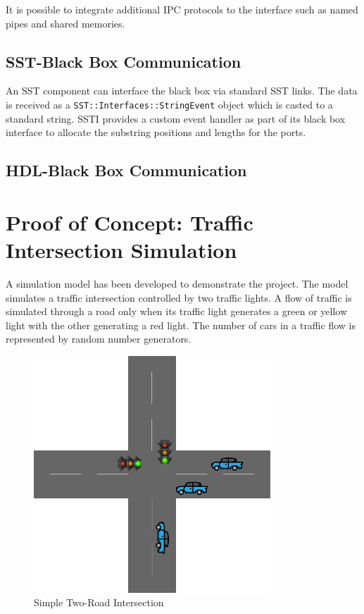 \documentclass{article}
\begin{document}
    It is possible to integrate additional IPC protocols to the interface such as named pipes and
    shared memories.

    \subsection{SST-Black Box Communication}
    An SST component can interface the black box via standard SST links. The data is received as a
    \lstinline{SST::Interfaces::StringEvent} object which is casted to a standard string. SSTI
    provides a custom event handler as part of its black box interface to allocate the substring
    positions and lengths for the ports.

    \subsection{HDL-Black Box Communication}

  \section{Proof of Concept: Traffic Intersection Simulation}
  A simulation model has been developed to demonstrate the project. The model simulates a traffic
  intersection controlled by two traffic lights. A flow of traffic is simulated through a road only
  when its traffic light generates a green or yellow light with the other generating a red light.
  The number of cars in a traffic flow is represented by random number generators.

  \begin{figure}[!h]
    \centering
    \includegraphics[width=3.5in]{diagrams/intersection.png}
    \caption{Simple Two-Road Intersection}
    \label{fig:intersection}
  \end{figure}
\end{document}

